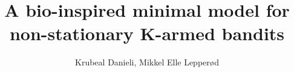 \documentclass{article}
\begin{document}
\title{A bio-inspired minimal model for non-stationary K-armed bandits}
\author{Krubeal Danieli, Mikkel Elle Lepperød}

\maketitle

\newpage

\tableofcontents

\newpage

















\newpage


\end{document}
